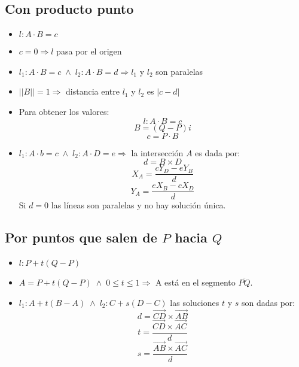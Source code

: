 \subsection{Con producto punto}
\begin{itemize}
\item $l: A \cdot B = c$
\item $c = 0 \Rightarrow l$ pasa por el origen
\item $l_1: A \cdot B = c \;\land\; l_2: A \cdot B = d \Rightarrow l_1$ y $l_2$ son paralelas
\item $||B|| = 1 \Rightarrow $ distancia entre $l_1$ y $l_2$ es $|c-d|$
\item Para obtener los valores: $$l: A\cdot B = c$$ $$B = (Q-P)i$$ $$c = P\cdot B$$ 
\item $l_1: A\cdot b = c \; \land \; l_2: A\cdot D = e \Rightarrow$ la intersecci\'on $A$ es dada por:
	$$d = B\times D$$ $$X_A = \frac{cY_D-eY_B}{d}$$ $$Y_A = \frac{eX_B-cX_D}{d}$$
	Si $d = 0$ las l\'ineas son paralelas y no hay soluci\'on \'unica. 
\end{itemize}

\subsection{Por puntos que salen de $P$ hacia $Q$}
\begin{itemize}
\item $l:P+t(Q-P)$
\item $A = P+t(Q-P) \;\land\; 0 \leq t \leq 1 \Rightarrow$ A est\'a en el segmento $\overline{PQ}$.
\item $l_1: A+t(B-A) \;\land\; l_2:C+s(D-C)$ las soluciones $t$ y $s$ son dadas por:
	$$d = \overrightarrow{CD}\times\overrightarrow{AB} $$ $$t = \frac{\overrightarrow{CD}\times\overrightarrow{AC}}{d}$$
	$$s = \frac{\overrightarrow{AB}\times\overrightarrow{AC}}{d}$$
\end{itemize}

